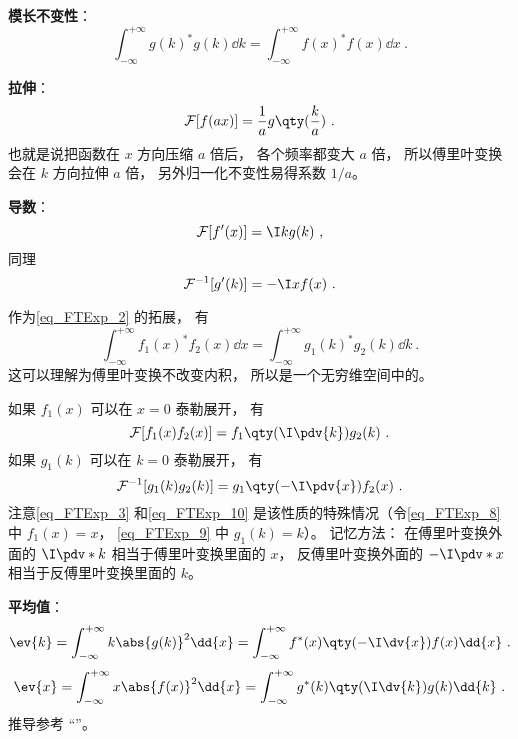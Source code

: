 \textbf{模长不变性}：
\begin{equation}\label{eq_FTExp_2}
\int_{-\infty}^{+\infty} g(k)^* g(k) \dd{k} = \int_{-\infty}^{+\infty} f(x)^* f(x) \dd{x}~.
\end{equation}

\textbf{拉伸}：
\begin{equation}
\mathcal F[f(ax)] = \frac{1}{a} g\qty(\frac{k}{a})~.
\end{equation}
也就是说把函数在 $x$ 方向压缩 $a$ 倍后， 各个频率都变大 $a$ 倍， 所以傅里叶变换会在 $k$ 方向拉伸 $a$ 倍， 另外归一化不变性易得系数 $1/a$。

\textbf{导数}：
\begin{equation}\label{eq_FTExp_3}
\mathcal F [f'(x)] = \I k g(k)~,
\end{equation}
同理
\begin{equation}\label{eq_FTExp_10}
\mathcal F^{-1} [g'(k)] = -\I x f(x)~.
\end{equation}

作为\autoref{eq_FTExp_2} 的拓展， 有
\begin{equation}
\int_{-\infty}^{+\infty} f_1(x)^* f_2(x) \dd{x} = \int_{-\infty}^{+\infty} g_1(k)^* g_2(k) \dd{k}~.
\end{equation}
这可以理解为傅里叶变换不改变内积， 所以是一个无穷维空间中的。

如果 $f_1(x)$ 可以在 $x = 0$ 泰勒展开， 有
\begin{equation}\label{eq_FTExp_8}
\mathcal{F}[f_1(x) f_2(x)] = f_1\qty(\I \pdv{k}) g_2(k)~.
\end{equation}
如果 $g_1(k)$ 可以在 $k = 0$ 泰勒展开， 有
\begin{equation}\label{eq_FTExp_9}
\mathcal{F}^{-1}[g_1(k) g_2(k)] = g_1\qty(-\I \pdv{x}) f_2(x)~.
\end{equation}
注意\autoref{eq_FTExp_3} 和\autoref{eq_FTExp_10} 是该性质的特殊情况（令\autoref{eq_FTExp_8} 中 $f_1(x) = x$， \autoref{eq_FTExp_9} 中 $g_1(k) = k$）。 记忆方法： 在傅里叶变换外面的 $\I\pdv*{k}$ 相当于傅里叶变换里面的 $x$， 反傅里叶变换外面的 $-\I\pdv*{x}$ 相当于反傅里叶变换里面的 $k$。

\textbf{平均值}：
\begin{equation}
\ev{k} = \int_{-\infty}^{+\infty} k\abs{g(k)}^2 \dd{x} = \int_{-\infty}^{+\infty} f^*(x)\qty(-\I \dv{x}) f(x) \dd{x}~.
\end{equation}
\begin{equation}
\ev{x} = \int_{-\infty}^{+\infty} x\abs{f(x)}^2 \dd{x} = \int_{-\infty}^{+\infty} g^*(k)\qty(\I \dv{k}) g(k) \dd{k}~.
\end{equation}
推导参考 “”。

